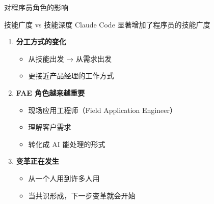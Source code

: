 \documentclass[aspectratio=169,xcolor=dvipsnames]{beamer}
\begin{document}
\begin{frame}{对程序员角色的影响}
  \begin{block}{技能广度 vs 技能深度}
    Claude Code 显著增加了程序员的技能广度
  \end{block}

  \vspace{0.3cm}

  \begin{enumerate}
    \item \textbf{分工方式的变化}
    \begin{itemize}
      \item 从技能出发 → 从需求出发
      \item 更接近产品经理的工作方式
    \end{itemize}

    \vspace{0.2cm}

    \item \textbf{FAE 角色越来越重要}
    \begin{itemize}
      \item 现场应用工程师（Field Application Engineer）
      \item 理解客户需求
      \item 转化成 AI 能处理的形式
    \end{itemize}

    \vspace{0.2cm}

    \item \textbf{变革正在发生}
    \begin{itemize}
      \item 从一个人用到许多人用
      \item 当共识形成，下一步变革就会开始
    \end{itemize}
  \end{enumerate}
\end{frame}
\end{document}
